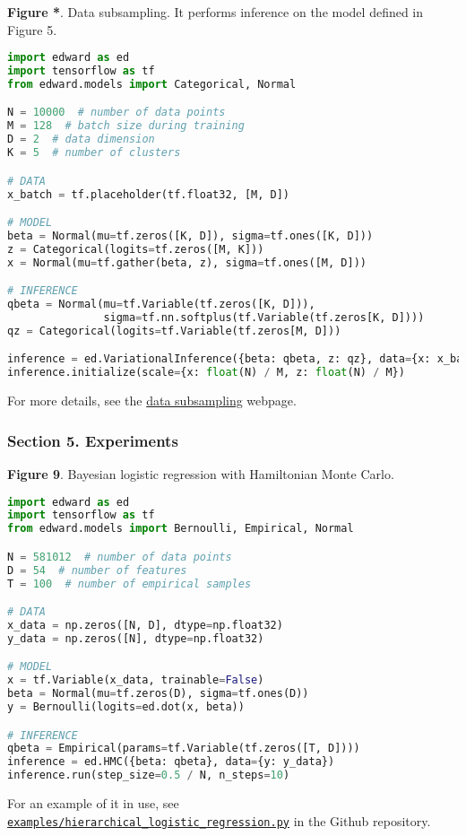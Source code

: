 \textbf{Figure *}. Data subsampling.
It performs inference on the model defined in Figure 5.
\begin{lstlisting}[language=python]
import edward as ed
import tensorflow as tf
from edward.models import Categorical, Normal

N = 10000  # number of data points
M = 128  # batch size during training
D = 2  # data dimension
K = 5  # number of clusters

# DATA
x_batch = tf.placeholder(tf.float32, [M, D])

# MODEL
beta = Normal(mu=tf.zeros([K, D]), sigma=tf.ones([K, D]))
z = Categorical(logits=tf.zeros([M, K]))
x = Normal(mu=tf.gather(beta, z), sigma=tf.ones([M, D]))

# INFERENCE
qbeta = Normal(mu=tf.Variable(tf.zeros([K, D])),
               sigma=tf.nn.softplus(tf.Variable(tf.zeros[K, D])))
qz = Categorical(logits=tf.Variable(tf.zeros[M, D]))

inference = ed.VariationalInference({beta: qbeta, z: qz}, data={x: x_batch})
inference.initialize(scale={x: float(N) / M, z: float(N) / M})
\end{lstlisting}
For more details, see the
\href{/api/data-subsampling}{data subsampling} webpage.

\subsubsection{Section 5. Experiments}

\textbf{Figure 9}. Bayesian logistic regression with Hamiltonian Monte Carlo.
\begin{lstlisting}[language=python]
import edward as ed
import tensorflow as tf
from edward.models import Bernoulli, Empirical, Normal

N = 581012  # number of data points
D = 54  # number of features
T = 100  # number of empirical samples

# DATA
x_data = np.zeros([N, D], dtype=np.float32)
y_data = np.zeros([N], dtype=np.float32)

# MODEL
x = tf.Variable(x_data, trainable=False)
beta = Normal(mu=tf.zeros(D), sigma=tf.ones(D))
y = Bernoulli(logits=ed.dot(x, beta))

# INFERENCE
qbeta = Empirical(params=tf.Variable(tf.zeros([T, D])))
inference = ed.HMC({beta: qbeta}, data={y: y_data})
inference.run(step_size=0.5 / N, n_steps=10)
\end{lstlisting}
For an example of it in use, see
\href{https://github.com/blei-lab/edward/blob/master/examples/hierarchical_logistic_regression.py}{\texttt{examples/hierarchical_logistic_regression.py}}
in the Github repository.

